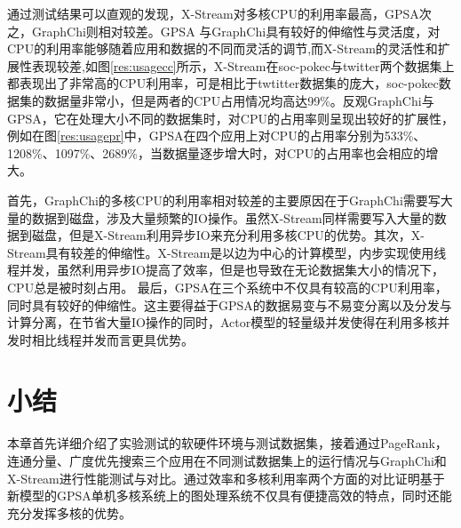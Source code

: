 通过测试结果可以直观的发现，X-Stream对多核CPU的利用率最高，GPSA次之，GraphChi则相对较差。GPSA
与GraphChi具有较好的伸缩性与灵活度，对CPU的利用率能够随着应用和数据的不同而灵活的调节,而X-Stream的灵活性和扩展性表现较差,如图\ref{res:usagecc}所示，X-Stream在soc-pokec与twitter两个数据集上都表现出了非常高的CPU利用率，可是相比于twtitter数据集的庞大，soc-pokec数据集的数据量非常小，但是两者的CPU占用情况均高达99\%。反观GraphChi与GPSA，它在处理大小不同的数据集时，对CPU的占用率则呈现出较好的扩展性，例如在图\ref{res:usagepr}中，GPSA在四个应用上对CPU的占用率分别为533\%、1208\%、1097\%、2689\%，当数据量逐步增大时，对CPU的占用率也会相应的增大。

首先，GraphChi的多核CPU的利用率相对较差的主要原因在于GraphChi需要写大量的数据到磁盘，涉及大量频繁的IO操作。虽然X-Stream同样需要写入大量的数据到磁盘，但是X-Stream利用异步IO来充分利用多核CPU的优势。其次，X-Stream具有较差的伸缩性。X-Stream是以边为中心的计算模型，内步实现使用线程并发，虽然利用异步IO提高了效率，但是也导致在无论数据集大小的情况下，CPU总是被时刻占用。
最后，GPSA在三个系统中不仅具有较高的CPU利用率，同时具有较好的伸缩性。这主要得益于GPSA的数据易变与不易变分离以及分发与计算分离，在节省大量IO操作的同时，Actor模型的轻量级并发使得在利用多核并发时相比线程并发而言更具优势。







\section{小结}

本章首先详细介绍了实验测试的软硬件环境与测试数据集，接着通过PageRank，连通分量、广度优先搜索三个应用在不同测试数据集上的运行情况与GraphChi和X-Stream进行性能测试与对比。通过效率和多核利用率两个方面的对比证明基于新模型的GPSA单机多核系统上的图处理系统不仅具有便捷高效的特点，同时还能充分发挥多核的优势。





